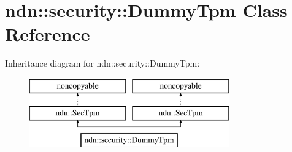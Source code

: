 \hypertarget{classndn_1_1security_1_1DummyTpm}{}\section{ndn\+:\+:security\+:\+:Dummy\+Tpm Class Reference}
\label{classndn_1_1security_1_1DummyTpm}
Inheritance diagram for ndn\+:\+:security\+:\+:Dummy\+Tpm\+:\begin{figure}[H]
\begin{center}
\leavevmode
\includegraphics[height=3.000000cm]{classndn_1_1security_1_1DummyTpm}
\end{center}
\end{figure}
